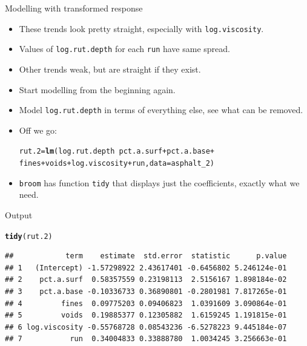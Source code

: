 \documentclass[unknownkeysallowed]{beamer}\usepackage[]{graphicx}\usepackage[]{color}
\makeatletter
\newcommand{\hlopt}[1]{\textcolor[rgb]{0,0,0}{#1}}%
\newcommand{\hlstd}[1]{\textcolor[rgb]{0.345,0.345,0.345}{#1}}%
\newcommand{\hlkwb}[1]{\textcolor[rgb]{0.69,0.353,0.396}{#1}}%
\newcommand{\hlkwc}[1]{\textcolor[rgb]{0.333,0.667,0.333}{#1}}%
\newcommand{\hlkwd}[1]{\textcolor[rgb]{0.737,0.353,0.396}{\textbf{#1}}}%
\newenvironment{kframe}{%
 \def\at@end@of@kframe{}%
 \ifinner\ifhmode%
  \def\at@end@of@kframe{\end{minipage}}%
  \begin{minipage}{\columnwidth}%
 \fi\fi%
 \def\FrameCommand##1{\hskip\@totalleftmargin \hskip-\fboxsep
 \colorbox{shadecolor}{##1}\hskip-\fboxsep
     \hskip-\linewidth \hskip-\@totalleftmargin \hskip\columnwidth}%
 \MakeFramed {\advance\hsize-\width
   \@totalleftmargin\z@ \linewidth\hsize
   \@setminipage}}%
 {\par\unskip\endMakeFramed%
 \at@end@of@kframe}
\newenvironment{knitrout}{}{} %
\makeatother
\begin{document}
\begin{frame}[fragile]{Modelling with transformed response}

  \begin{itemize}
    
  \item These trends look pretty straight, especially with
    \texttt{log.viscosity}. 
  \item Values of \texttt{log.rut.depth} for each \texttt{run} have
    same spread.
  \item Other trends weak, but are straight if they exist.
    
    
  \item Start modelling from the beginning again.
  \item Model \texttt{log.rut.depth} in terms of everything else, see
    what can be removed.
    
  \item Off we go:
\begin{knitrout}
\color{fgcolor}\begin{kframe}
\begin{alltt}
\hlstd{rut.2}\hlkwb{=}\hlkwd{lm}\hlstd{(log.rut.depth}\hlopt{~}\hlstd{pct.a.surf}\hlopt{+}\hlstd{pct.a.base}\hlopt{+}
   \hlstd{fines}\hlopt{+}\hlstd{voids}\hlopt{+}\hlstd{log.viscosity}\hlopt{+}\hlstd{run,}\hlkwc{data}\hlstd{=asphalt_2)}
\end{alltt}
\end{kframe}
\end{knitrout}
\item \texttt{broom} has function \texttt{tidy} that displays just the
  coefficients, exactly what we need.
  \end{itemize}
  
\end{frame}


\begin{frame}[fragile]{Output}



\begin{knitrout}\footnotesize
{}\color{fgcolor}\begin{kframe}
\begin{alltt}
\hlkwd{tidy}\hlstd{(rut.2)}
\end{alltt}
\begin{verbatim}
##            term    estimate  std.error  statistic      p.value
## 1   (Intercept) -1.57298922 2.43617401 -0.6456802 5.246124e-01
## 2    pct.a.surf  0.58357559 0.23198113  2.5156167 1.898184e-02
## 3    pct.a.base -0.10336733 0.36890801 -0.2801981 7.817265e-01
## 4         fines  0.09775203 0.09406823  1.0391609 3.090864e-01
## 5         voids  0.19885377 0.12305882  1.6159245 1.191815e-01
## 6 log.viscosity -0.55768728 0.08543236 -6.5278223 9.445184e-07
## 7           run  0.34004833 0.33888780  1.0034245 3.256663e-01
\end{verbatim}
\end{kframe}
\end{knitrout}
    


\end{frame}
\end{document}
